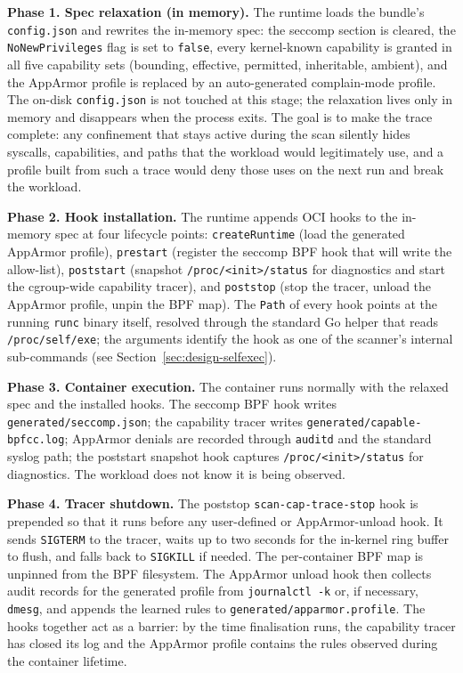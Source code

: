 \textbf{Phase 1. Spec relaxation (in memory).} The runtime loads the bundle's \texttt{config.json} and rewrites the in-memory spec: the seccomp section is cleared, the \texttt{NoNewPrivileges} flag is set to \texttt{false}, every kernel-known capability is granted in all five capability sets (bounding, effective, permitted, inheritable, ambient), and the AppArmor profile is replaced by an auto-generated complain-mode profile. The on-disk \texttt{config.json} is not touched at this stage; the relaxation lives only in memory and disappears when the process exits. The goal is to make the trace complete: any confinement that stays active during the scan silently hides syscalls, capabilities, and paths that the workload would legitimately use, and a profile built from such a trace would deny those uses on the next run and break the workload.

\textbf{Phase 2. Hook installation.} The runtime appends OCI hooks to the in-memory spec at four lifecycle points: \texttt{createRuntime} (load the generated AppArmor profile), \texttt{prestart} (register the seccomp BPF hook that will write the allow-list), \texttt{poststart} (snapshot \texttt{/proc/<init>/status} for diagnostics and start the cgroup-wide capability tracer), and \texttt{poststop} (stop the tracer, unload the AppArmor profile, unpin the BPF map). The \texttt{Path} of every hook points at the running \texttt{runc} binary itself, resolved through the standard Go helper that reads \texttt{/proc/self/exe}; the arguments identify the hook as one of the scanner's internal sub-commands (see Section~\ref{sec:design-selfexec}).

\textbf{Phase 3. Container execution.} The container runs normally with the relaxed spec and the installed hooks. The seccomp BPF hook writes \texttt{generated/seccomp.json}; the capability tracer writes \texttt{generated/capable-bpfcc.log}; AppArmor denials are recorded through \texttt{auditd} and the standard syslog path; the poststart snapshot hook captures \texttt{/proc/<init>/status} for diagnostics. The workload does not know it is being observed.

\textbf{Phase 4. Tracer shutdown.} The poststop \texttt{scan-cap-trace-stop} hook is prepended so that it runs before any user-defined or AppArmor-unload hook. It sends \texttt{SIGTERM} to the tracer, waits up to two seconds for the in-kernel ring buffer to flush, and falls back to \texttt{SIGKILL} if needed. The per-container BPF map is unpinned from the BPF filesystem. The AppArmor unload hook then collects audit records for the generated profile from \texttt{journalctl -k} or, if necessary, \texttt{dmesg}, and appends the learned rules to \texttt{generated/apparmor.profile}. The hooks together act as a barrier: by the time finalisation runs, the capability tracer has closed its log and the AppArmor profile contains the rules observed during the container lifetime.

